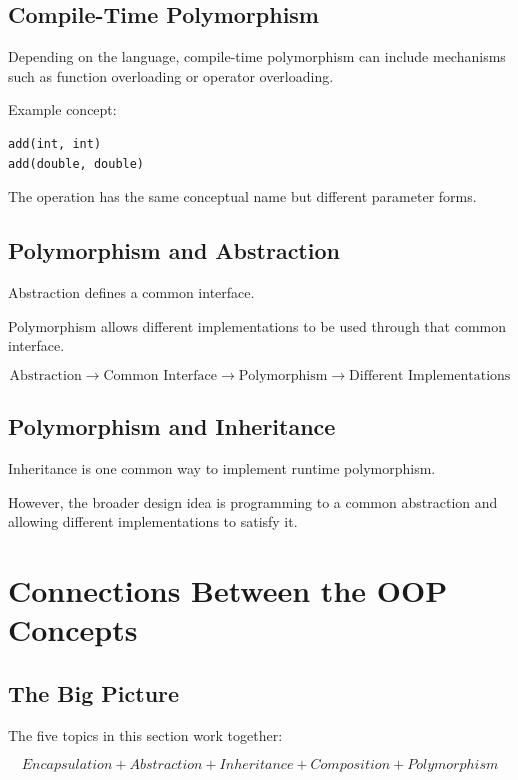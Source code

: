 \documentclass[11pt,a4paper]{article}
\begin{document}
\subsection{Compile-Time Polymorphism}

Depending on the language, compile-time polymorphism can include mechanisms
such as function overloading or operator overloading.

Example concept:

\begin{verbatim}
add(int, int)
add(double, double)
\end{verbatim}

The operation has the same conceptual name but different parameter forms.

\subsection{Polymorphism and Abstraction}

Abstraction defines a common interface.

Polymorphism allows different implementations to be used through that common
interface.

\[
\text{Abstraction}
\rightarrow
\text{Common Interface}
\rightarrow
\text{Polymorphism}
\rightarrow
\text{Different Implementations}
\]

\subsection{Polymorphism and Inheritance}

Inheritance is one common way to implement runtime polymorphism.

However, the broader design idea is programming to a common abstraction and
allowing different implementations to satisfy it.

\section{Connections Between the OOP Concepts}

\subsection{The Big Picture}

The five topics in this section work together:

\[
\boxed{
Encapsulation
+
Abstraction
+
Inheritance
+
Composition
+
Polymorphism
}
\]
\end{document}
